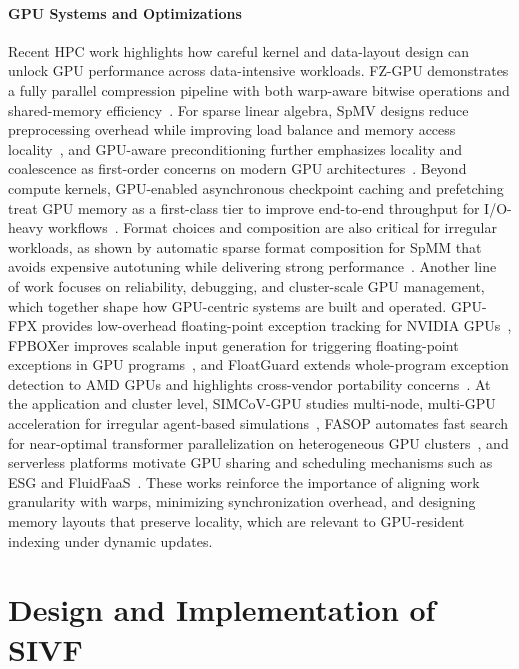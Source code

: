 \documentclass[sigconf,anonymous]{acmart}
\theoremstyle{plain}
\theoremstyle{definition}
\theoremstyle{remark}
\begin{document}
\paragraph{GPU Systems and Optimizations}
Recent HPC work highlights how careful kernel and data-layout design can unlock GPU performance across data-intensive workloads. FZ-GPU demonstrates a fully parallel compression pipeline with both warp-aware bitwise operations and shared-memory efficiency~\cite{10.1145/3588195.3592994}. For sparse linear algebra, SpMV designs reduce preprocessing overhead while improving load balance and memory access locality~\cite{10.1145/3588195.3593002}, and GPU-aware preconditioning further emphasizes locality and coalescence as first-order concerns on modern GPU architectures~\cite{10.1145/3625549.3658683}. Beyond compute kernels, GPU-enabled asynchronous checkpoint caching and prefetching treat GPU memory as a first-class tier to improve end-to-end throughput for I/O-heavy workflows~\cite{10.1145/3588195.3592987}. Format choices and composition are also critical for irregular workloads, as shown by automatic sparse format composition for SpMM that avoids expensive autotuning while delivering strong performance~\cite{10.1145/3731545.3731574}.
Another line of work focuses on reliability, debugging, and cluster-scale GPU management, which together shape how GPU-centric systems are built and operated. GPU-FPX provides low-overhead floating-point exception tracking for NVIDIA GPUs~\cite{10.1145/3588195.3592991}, FPBOXer improves scalable input generation for triggering floating-point exceptions in GPU programs~\cite{10.1145/3625549.3658660}, and FloatGuard extends whole-program exception detection to AMD GPUs and highlights cross-vendor portability concerns~\cite{10.1145/3731545.3731586}. At the application and cluster level, SIMCoV-GPU studies multi-node, multi-GPU acceleration for irregular agent-based simulations~\cite{10.1145/3625549.3658692}, FASOP automates fast search for near-optimal transformer parallelization on heterogeneous GPU clusters~\cite{10.1145/3625549.3658687}, and serverless platforms motivate GPU sharing and scheduling mechanisms such as ESG and FluidFaaS~\cite{10.1145/3625549.3658657,10.1145/3731545.3731580}. These works reinforce the importance of aligning work granularity with warps, minimizing synchronization overhead, and designing memory layouts that preserve locality, which are relevant to GPU-resident indexing under dynamic updates.

\section{Design and Implementation of SIVF}
\label{sec:design_implementation}
\end{document}
